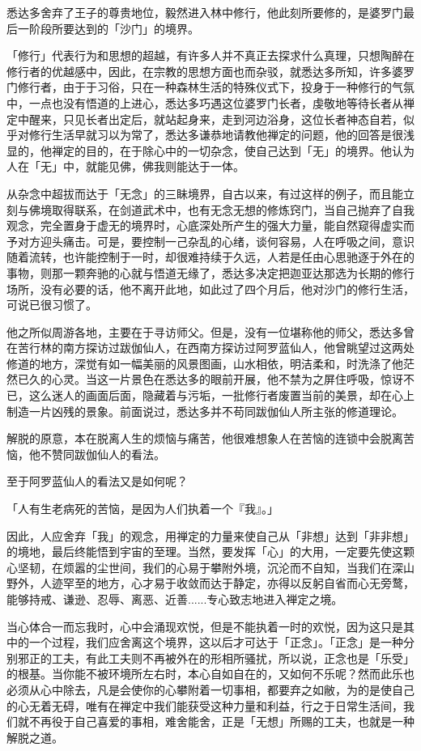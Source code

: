 \documentclass[12pt,twoside,openany]{book}
\begin{document}
悉达多舍弃了王子的尊贵地位，毅然进入林中修行，他此刻所要修的，是婆罗门最后一阶段所要达到的「沙门」的境界。

「修行」代表行为和思想的超越，有许多人并不真正去探求什么真理，只想陶醉在修行者的优越感中，因此，在宗教的思想方面也而杂驳，就悉达多所知，许多婆罗门修行者，由于于习俗，只在一种森林生活的特殊仪式下，投身于一种修行的气氛中，一点也没有悟道的上进心，悉达多巧遇这位婆罗门长者，虔敬地等待长者从禅定中醒来，只见长者出定后，就站起身来，走到河边浴身，这位长者神态自若，似乎对修行生活早就习以为常了，悉达多谦恭地请教他禅定的问题，他的回答是很浅显的，他禅定的目的，在于除心中的一切杂念，使自己达到「无」的境界。他认为人在「无」中，就能见佛，佛我则能达于一体。

从杂念中超拔而达于「无念」的三眛境界，自古以来，有过这样的例子，而且能立刻与佛境取得联系，在剑道武术中，也有无念无想的修炼窍门，当自己抛弃了自我观念，完全置身于虚无的境界时，心底深处所产生的强大力量，能自然窥得虚实而予对方迎头痛击。可是，要控制一己杂乱的心绪，谈何容易，人在呼吸之间，意识随着流转，也许能控制于一时，却很难持续于久远，人若是任由心思驰逐于外在的事物，则那一颗奔驰的心就与悟道无缘了，悉达多决定把迦亚达那选为长期的修行场所，没有必要的话，他不离开此地，如此过了四个月后，他对沙门的修行生活，可说已很习惯了。

他之所似周游各地，主要在于寻访师父。但是，没有一位堪称他的师父，悉达多曾在苦行林的南方探访过跋伽仙人，在西南方探访过阿罗蓝仙人，他曾眺望过这两处修道的地方，深觉有如一幅美丽的风景图画，山水相依，明洁柔和，时洗涤了他茫然已久的心灵。当这一片景色在悉达多的眼前开展，他不禁为之屏住呼吸，惊讶不已，这么迷人的画面后面，隐藏着与污垢，一批修行者废置当前的美景，却在心上制造一片凶残的景象。前面说过，悉达多并不苟同跋伽仙人所主张的修道理论。

解脱的原意，本在脱离人生的烦恼与痛苦，他很难想象人在苦恼的连锁中会脱离苦恼，他不赞同跋伽仙人的看法。

至于阿罗蓝仙人的看法又是如何呢？

「人有生老病死的苦恼，是因为人们执着一个『我』。」

因此，人应舍弃「我」的观念，用禅定的力量来使自己从「非想」达到「非非想」的境地，最后终能悟到宇宙的至理。当然，要发挥「心」的大用，一定要先使这颗心坚韧，在烦嚣的尘世间，我们的心易于攀附外境，沉沦而不自知，当我们在深山野外，人迹罕至的地方，心才易于收敛而达于静定，亦得以反躬自省而心无旁鹜，能够持戒、谦逊、忍辱、离恶、近善......专心致志地进入禅定之境。

当心体合一而忘我时，心中会涌现欢悦，但是不能执着一时的欢悦，因为这只是其中的一个过程，我们应舍离这个境界，这以后才可达于「正念」。「正念」是一种分别邪正的工夫，有此工夫则不再被外在的形相所骚扰，所以说，正念也是「乐受」的根基。当你能不被环境所左右时，本心自如自在的，又如何不乐呢？然而此乐也必须从心中除去，凡是会使你的心攀附着一切事相，都要弃之如敝，为的是使自己的心无着无碍，唯有在禅定中我们能获受这种力量和利益，行之于日常生活间，我们就不再役于自己喜爱的事相，难舍能舍，正是「无想」所赐的工夫，也就是一种解脱之道。
\end{document}
